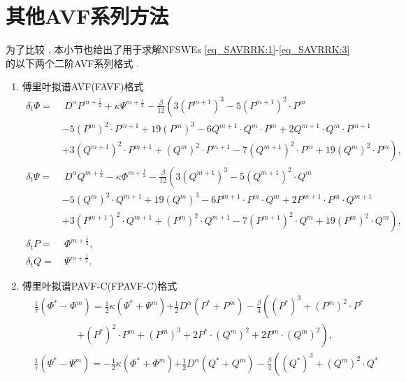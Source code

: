 \section{其他AVF系列方法}\label{Section_PAVF: 3-1}
为了比较 , 本小节也给出了用于求解NFSWEs \eqref{eq_SAVRRK:1}-\eqref{eq_SAVRRK:3} 的以下两个二阶AVF系列格式 . 
\begin{enumerate}[$\bullet$]
\item 傅里叶拟谱AVF(FAVF)格式
\begin{align}
\delta_{t} \varPhi =&~{D^{\alpha} P^{m+\frac{1}{2}}}+\kappa \Psi^{m+\frac{1}{2}}-\frac{\beta}{12}\left(3 (P^{m+1})^3-5 (P^{m+1})^2\cdot P^{m}\right . \nonumber\\
		&-5 (P^{m})^2\cdot P^{m+1}+19 (P^{m})^3-6 Q^{m+1}\cdot Q^{m}\cdot P^{m}+2 Q^{m+1}\cdot Q^{m}\cdot P^{m+1} \nonumber\\
		&+\left . 3 (Q^{m+1})^2\cdot P^{m+1}+(Q^{m})^2\cdot P^{m+1}-7 (Q^{m+1})^2\cdot P^{m}+19 (Q^{m} )^2\cdot P^{m}\right) , \label{eq_PAVF:66}\\
\delta_{t} \Psi =&~{D^{\alpha} Q^{m+\frac{1}{2}}}-\kappa \varPhi^{m+\frac{1}{2}}-\frac{\beta}{12}\left(3 (Q^{m+1})^3-5 (Q^{m+1})^2\cdot Q^{m}\right . \nonumber\\
		&-5 (Q^{m})^2\cdot Q^{m+1}+19 (Q^{m})^3-6 P^{m+1}\cdot P^{m}\cdot Q^{m}+2 P^{m+1}\cdot P^{m}\cdot Q^{m+1} \nonumber\\
		&+\left . 3 (P^{m+1})^2\cdot Q^{m+1}+(P^{m})^2\cdot Q^{m+1}-7 (P^{m+1})^2\cdot Q^{m}+19 (P^{m} )^2\cdot Q^{m}\right) , \label{eq_PAVF:67}\\
\delta_{t} P=&~\varPhi^{m+\frac{1}{2}} , \label{eq_PAVF:68}\\
\delta_{t} Q=&~\Psi^{m+\frac{1}{2}} . \label{eq_PAVF:69}
\end{align}
\item 傅里叶拟谱PAVF-C(FPAVF-C)格式
\begin{align}
&\frac{1}{\tau}\left(\varPhi^{*}-\varPhi^{m}\right)=\frac{1}{2}\kappa(\Psi^{*}+\Psi^{m}){+\frac{1}{2}D^{\alpha} (P^{*}+P^{m})}-\frac{\beta}{4}\left( (P^{*})^3+ (P^{m})^{2}\cdot P^{*}\right . \nonumber\\
		&~~~~~~~~~~~~~~~~~~~~\left . + (P^{*})^{2}\cdot P^{m}+ (P^{m})^{3}+2 P^{*}\cdot (Q^{m})^{2}+2 P^{m}\cdot (Q^{m})^{2}\right) , \label{eq_PAVF:90}\\
&\frac{1}{\tau}\left(\Psi^{*}-\Psi^{m}\right)=-\frac{1}{2}\kappa (\varPhi^{*}+\varPhi^{m}){+\frac{1}{2}D^{\alpha} (Q^{*}+Q^{m})}-\frac{\beta}{4}\left( (Q^{*})^3+ (Q^{m})^{2}\cdot Q^{*}\right . \nonumber\\

\end{align}
\end{enumerate}
